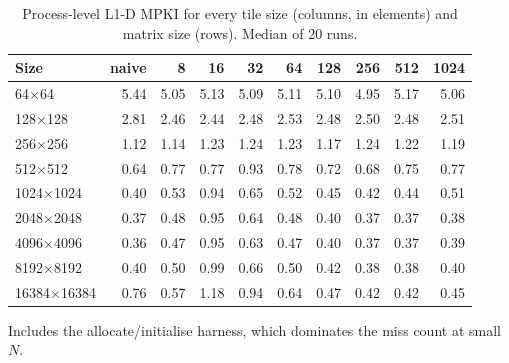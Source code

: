 \begin{table}[htbp]
\centering
\small
\caption{Process-level L1-D MPKI for every tile size (columns, in elements) and matrix size (rows). Median of 20 runs.}
\label{tab:tile-mpki-process}
\begin{tabular}{lrrrrrrrrr}
\toprule
Size & naive & 8 & 16 & 32 & 64 & 128 & 256 & 512 & 1024 \\
\midrule
64$\times$64 & 5.44 & 5.05 & 5.13 & 5.09 & 5.11 & 5.10 & 4.95 & 5.17 & 5.06 \\
128$\times$128 & 2.81 & 2.46 & 2.44 & 2.48 & 2.53 & 2.48 & 2.50 & 2.48 & 2.51 \\
256$\times$256 & 1.12 & 1.14 & 1.23 & 1.24 & 1.23 & 1.17 & 1.24 & 1.22 & 1.19 \\
512$\times$512 & 0.64 & 0.77 & 0.77 & 0.93 & 0.78 & 0.72 & 0.68 & 0.75 & 0.77 \\
1024$\times$1024 & 0.40 & 0.53 & 0.94 & 0.65 & 0.52 & 0.45 & 0.42 & 0.44 & 0.51 \\
2048$\times$2048 & 0.37 & 0.48 & 0.95 & 0.64 & 0.48 & 0.40 & 0.37 & 0.37 & 0.38 \\
4096$\times$4096 & 0.36 & 0.47 & 0.95 & 0.63 & 0.47 & 0.40 & 0.37 & 0.37 & 0.39 \\
8192$\times$8192 & 0.40 & 0.50 & 0.99 & 0.66 & 0.50 & 0.42 & 0.38 & 0.38 & 0.40 \\
16384$\times$16384 & 0.76 & 0.57 & 1.18 & 0.94 & 0.64 & 0.47 & 0.42 & 0.42 & 0.45 \\
\bottomrule
\end{tabular}

\vspace{2pt}
\begin{minipage}{\linewidth}\footnotesize Includes the allocate/initialise harness, which dominates the miss count at small $N$.\end{minipage}
\end{table}
